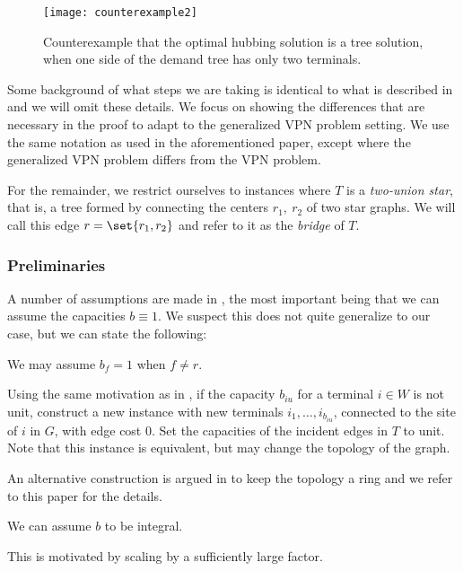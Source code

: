 \begin{figure}
    \centering
    \texttt{[image: counterexample2]}
    \caption{Counterexample that the optimal hubbing solution is a tree solution, when one side of the demand tree has only two terminals.}
    \label{fig:counterex2}
\end{figure}

Some background of what steps we are taking is identical to what is described in \cite{grandoni2008short} and we will omit these details.
We focus on showing the differences that are necessary in the proof to adapt to the generalized VPN problem setting.
We use the same notation as used in the aforementioned paper, except where the generalized VPN problem differs from the VPN problem.

For the remainder, we restrict ourselves to instances where $T$ is a \emph{two-union star}, that is, a tree formed by connecting the centers $r_1,\ r_2$ of two star graphs.
We will call this edge $r = \set{r_1, r_2}$ and refer to it as the \emph{bridge} of $T$.

\subsubsection{Preliminaries}
A number of assumptions are made in \cite{grandoni2008short}, the most important being that we can assume the capacities $b \equiv 1$.
We suspect this does not quite generalize to our case, but we can state the following:

\begin{fact}
    We may assume $b_f = 1$ when $f \neq r$.
\end{fact}
Using the same motivation as in \cite{grandoni2008short}, if the capacity $b_{iu}$ for a terminal $i \in W$ is not unit, construct a new instance with new terminals $i_1, \dots, i_{b_{iu}}$, connected to the site of $i$ in $G$, with edge cost $0$.
Set the capacities of the incident edges in $T$ to unit.
Note that this instance is equivalent, but may change the topology of the graph.

An alternative construction is argued in \cite{grandoni2008short} to keep the topology a ring and we refer to this paper for the details.

\begin{fact}
    We can assume $b$ to be integral.
\end{fact}
This is motivated by scaling by a sufficiently large factor.

